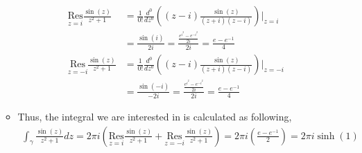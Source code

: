 \documentclass[10pt,a4paper]{article}
\theoremstyle{definition}
\begin{document}
\begin{enumerate}[label = (\alph*)]
\begin{itemize}
	\begin{align*}
	\underset{z = i}{\text{Res}}\frac{\sin(z)}{z^2 + 1} &= \frac{1}{0!}\frac{d^0}{dz^0}\left((z - i)\frac{\sin(z)}{(z + i)(z - i)}\right)\bigg|_{z = i}\\
	&= \frac{\sin(i)}{2i} = \frac{\displaystyle \frac{e^{i^2} - e^{-i^2}}{2i}}{2i} = \frac{e - e^{-1}}{4}\\
	\underset{z = -i}{\text{Res}}\frac{\sin(z)}{z^2 + 1} &= \frac{1}{0!}\frac{d^0}{dz^0}\left((z - i)\frac{\sin(z)}{(z + i)(z - i)}\right)\bigg|_{z = -i}\\
	&= \frac{\sin(-i)}{-2i} = \frac{\displaystyle \frac{e^{i^2} - e^{-i^2}}{2i}}{2i} = \frac{e - e^{-1}}{4}
	\end{align*}
	\item Thus, the integral we are interested in is calculated as following,
	\begin{align*}
	\displaystyle \int_{\gamma} \frac{\sin(z)}{z^2 + 1}dz = 2\pi i\left( \underset{z = i}{\text{Res}}\frac{\sin(z)}{z^2 + 1} + \underset{z = -i}{\text{Res}}\frac{\sin(z)}{z^2 + 1} \right) = 2\pi i \left( \frac{e - e^{-1}}{2} \right) = \boxed{2 \pi i \sinh(1)}
	\end{align*}
	\end{itemize}
\end{enumerate}
\end{document}
